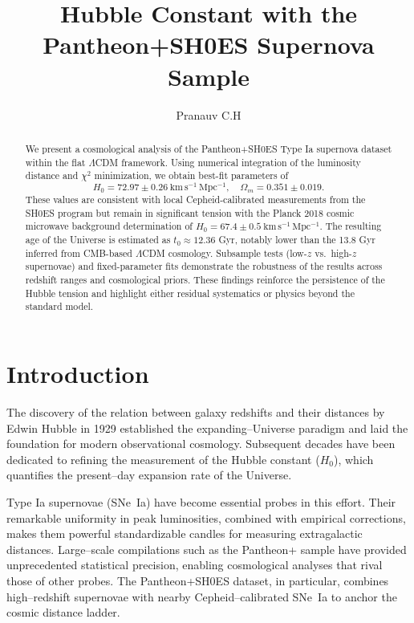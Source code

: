 \documentclass[12pt]{article}
\title{\textbf{Hubble Constant with the Pantheon+SH0ES Supernova Sample}}
\author{Pranauv C.H}
\date{}
\begin{document}
\maketitle


\begin{abstract}
We present a cosmological analysis of the Pantheon+SH0ES Type Ia supernova dataset within the flat $\Lambda$CDM framework. 
Using numerical integration of the luminosity distance and $\chi^2$ minimization, we obtain best-fit parameters of
\[
H_0 = 72.97 \pm 0.26 \ \mathrm{km\,s^{-1}\,Mpc^{-1}}, \quad \Omega_m = 0.351 \pm 0.019.
\]
These values are consistent with local Cepheid-calibrated measurements from the SH0ES program but remain in significant 
tension with the Planck 2018 cosmic microwave background determination of $H_0 = 67.4 \pm 0.5\ \mathrm{km\,s^{-1}\,Mpc^{-1}}$. 
The resulting age of the Universe is estimated as $t_0 \approx 12.36$ Gyr, notably lower than the 13.8 Gyr inferred from 
CMB-based $\Lambda$CDM cosmology. Subsample tests (low-$z$ vs.\ high-$z$ supernovae) and fixed-parameter fits demonstrate 
the robustness of the results across redshift ranges and cosmological priors. These findings reinforce the persistence of 
the Hubble tension and highlight either residual systematics or physics beyond the standard model.
\end{abstract}

\newpage
\tableofcontents

\newpage
\section{Introduction}

The discovery of the relation between galaxy redshifts and their distances by Edwin Hubble in 1929 established the expanding–Universe 
paradigm and laid the foundation for modern observational cosmology. Subsequent decades have been dedicated to refining the measurement of 
the Hubble constant ($H_0$), which quantifies the present–day expansion rate of the Universe.

Type Ia supernovae (SNe~Ia) have become essential probes in this effort. Their remarkable uniformity in peak luminosities, combined with 
empirical corrections, makes them powerful standardizable candles for measuring extragalactic distances. Large–scale compilations such as 
the Pantheon+ sample have provided unprecedented statistical precision, enabling cosmological analyses that rival those of other probes. 
The Pantheon+SH0ES dataset, in particular, combines high–redshift supernovae with nearby Cepheid–calibrated SNe~Ia to anchor the cosmic distance ladder.
\end{document}
